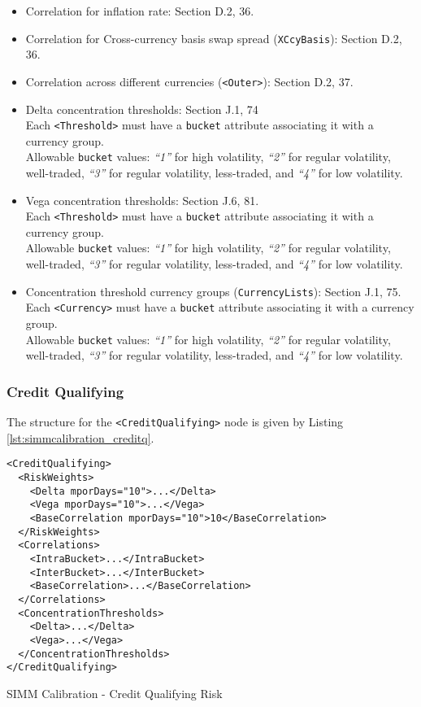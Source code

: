 \begin{itemize}
  \item Correlation for inflation rate:  Section D.2, 36.
  \item Correlation for Cross-currency basis swap spread ({\tt XCcyBasis}): Section D.2, 36.
  \item Correlation across different currencies ({\tt <Outer>}): Section D.2, 37.
  \item Delta concentration thresholds: Section J.1, 74 \\
    Each {\tt <Threshold>} must have a {\tt bucket} attribute associating it with a currency group. \\
    Allowable {\tt bucket} values: \emph{``1''} for high volatility, \emph{``2''} for regular volatility, well-traded,
    \emph{``3''} for regular volatility, less-traded, and \emph{``4''} for low volatility.
  \item Vega concentration thresholds: Section J.6, 81. \\
    Each {\tt <Threshold>} must have a {\tt bucket} attribute associating it with a currency group. \\
    Allowable {\tt bucket} values: \emph{``1''} for high volatility, \emph{``2''} for regular volatility, well-traded,
    \emph{``3''} for regular volatility, less-traded, and \emph{``4''} for low volatility.
  \item Concentration threshold currency groups ({\tt CurrencyLists}): Section J.1, 75. \\
    Each {\tt <Currency>} must have a {\tt bucket} attribute associating it with a currency group. \\
    Allowable {\tt bucket} values: \emph{``1''} for high volatility, \emph{``2''} for regular volatility, well-traded,
    \emph{``3''} for regular volatility, less-traded, and \emph{``4''} for low volatility.
\end{itemize}

\subsubsection{Credit Qualifying}
The structure for the {\tt <CreditQualifying>} node is given by Listing \ref{lst:simmcalibration_creditq}.

\begin{listing}[H]
\begin{verbatim}
<CreditQualifying>
  <RiskWeights>
    <Delta mporDays="10">...</Delta>
    <Vega mporDays="10">...</Vega>
    <BaseCorrelation mporDays="10">10</BaseCorrelation>
  </RiskWeights>
  <Correlations>
    <IntraBucket>...</IntraBucket>
    <InterBucket>...</InterBucket>
    <BaseCorrelation>...</BaseCorrelation>
  </Correlations>
  <ConcentrationThresholds>
    <Delta>...</Delta>
    <Vega>...</Vega>
  </ConcentrationThresholds>
</CreditQualifying>
\end{verbatim}
\caption{SIMM Calibration - Credit Qualifying Risk}
\label{lst:simmcalibration_creditq}
\end{listing}

